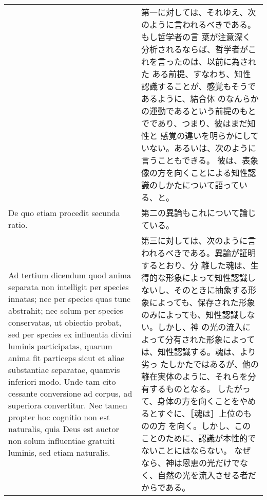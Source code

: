 \documentclass[10pt]{jsarticle} %
\begin{document}
\begin{longtable}{p{21em}p{21em}}
&

第一に対しては、それゆえ、次のように言われるべきである。もし哲学者の言
葉が注意深く分析されるならば、哲学者がこれを言ったのは、以前に為された
ある前提、すなわち、知性認識することが、感覚もそうであるように、結合体
のなんらかの運動であるという前提のもとでであり、つまり、彼はまだ知性と
感覚の違いを明らかにしていない。あるいは、次のように言うこともできる。
彼は、表象像の方を向くことによる知性認識のしかたについて語っている、と。

\\



De quo etiam procedit secunda ratio.


&

第二の異論もこれについて論じている。

\\



Ad tertium dicendum quod anima separata non intelligit per species
innatas; nec per species quas tunc abstrahit; nec solum per species
conservatas, ut obiectio probat, sed per species ex influentia divini
luminis participatas, quarum anima fit particeps sicut et aliae
substantiae separatae, quamvis inferiori modo. Unde tam cito cessante
conversione ad corpus, ad superiora convertitur. Nec tamen propter hoc
cognitio non est naturalis, quia Deus est auctor non solum influentiae
gratuiti luminis, sed etiam naturalis.


&

第三に対しては、次のように言われるべきである。異論が証明するとおり、分
離した魂は、生得的な形象によって知性認識しないし、そのときに抽象する形
象によっても、保存された形象のみによっても、知性認識しない。しかし、神
の光の流入によって分有された形象によっては、知性認識する。魂は、より劣っ
たしかたではあるが、他の離在実体のように、それらを分有するものとなる。
したがって、身体の方を向くことをやめるとすぐに、［魂は］上位のものの方
を向く。しかし、このことのために、認識が本性的でないことにはならない。
なぜなら、神は恩恵の光だけでなく、自然の光を流入させる者だからである。


\end{longtable}
%
%
%
\end{document}
